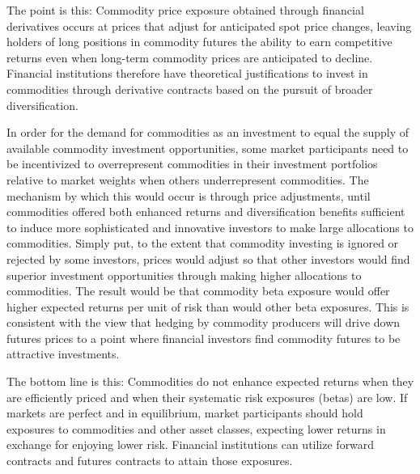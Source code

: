 \documentclass[11pt]{article}
\begin{document}
The point is this: Commodity price exposure obtained through financial derivatives occurs at prices that adjust for anticipated spot price changes, leaving holders of long positions in commodity futures the ability to earn competitive returns even when long-term commodity prices are anticipated to decline. Financial institutions therefore have theoretical justifications to invest in commodities through derivative contracts based on the pursuit of broader diversification.

In order for the demand for commodities as an investment to equal the supply of available commodity investment opportunities, some market participants need to be incentivized to overrepresent commodities in their investment portfolios relative to market weights when others underrepresent commodities. The mechanism by which this would occur is through price adjustments, until commodities offered both enhanced returns and diversification benefits sufficient to induce more sophisticated and innovative investors to make large allocations to commodities. Simply put, to the extent that commodity investing is ignored or rejected by some investors, prices would adjust so that other investors would find superior investment opportunities through making higher allocations to commodities. The result would be that commodity beta exposure would offer higher expected returns per unit of risk than would other beta exposures. This is consistent with the view that hedging by commodity producers will drive down futures prices to a point where financial investors find commodity futures to be attractive investments.

The bottom line is this: Commodities do not enhance expected returns when they are efficiently priced and when their systematic risk exposures (betas) are low. If markets are perfect and in equilibrium, market participants should hold exposures to commodities and other asset classes, expecting lower returns in exchange for enjoying lower risk. Financial institutions can utilize forward contracts and futures contracts to attain those exposures.
\end{document}
